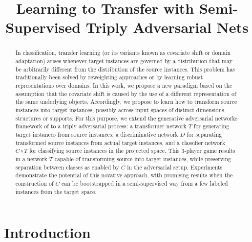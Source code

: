 \documentclass[aoas,preprint,authoryear]{imsart}
\begin{document}
\begin{frontmatter}

\title{Learning to Transfer with Semi-Supervised Triply Adversarial Nets}


\author{ }

\begin{abstract}

In classification, transfer learning (or its variants known as covariate shift
or domain adaptation) arises whenever target instances are governed by a
distribution that may be arbitrarily different from the distribution of the
source instances. This problem has traditionally been solved by reweighting
approaches or by learning robust representations over domains. In this work, we
propose a new paradigm based on the assumption that the covariate shift is
caused by the use of a different representation of the same underlying objects.
Accordingly, we propose to learn how to transform source instances into target
instances, possibly across input spaces of distinct dimensions, structures or
supports. For this purpose, we extend the generative adversarial networks
framework of \cite{goodfellow2014generative} to a triply adversarial process: a
transformer network $T$ for generating target instances from source instances, a
discriminative network $D$ for separating transformed source instances from
actual target instances, and a classifier network $C \circ T$ for classifying source
instances in the projected space. This 3-player game results in a network $T$
capable of transforming source into target instances, while preserving
separation between classes as enabled by $C$ in the adversarial setup.
Experiments demonstrate the potential of this novative approach, with promising
results when the construction of $C$ can be bootstrapped in a semi-supervised
way  from a few labeled instances from the target space.

\end{abstract}

\end{frontmatter}

\section{Introduction}
\end{document}
